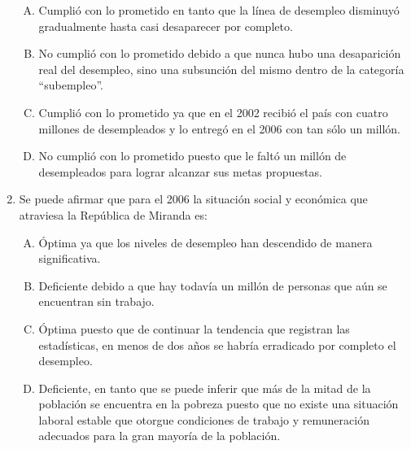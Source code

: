 \begin{enumerate}
\begin{enumerate}[(A) ]
\item   Cumplió con lo prometido en tanto que la línea de desempleo disminuyó gradualmente hasta casi desaparecer por completo.
 \item  No cumplió con lo prometido debido a que nunca hubo una desaparición real del desempleo, sino una subsunción del mismo dentro de la categoría ``subempleo''.
\item Cumplió con lo prometido ya que en el 2002 recibió el país con cuatro millones de desempleados y lo entregó en el 2006 con tan sólo un millón.
\item No cumplió con lo prometido puesto que le faltó un millón de desempleados para lograr alcanzar sus metas propuestas.
\end{enumerate}

\item Se puede afirmar que para el 2006 la situación social y económica que atraviesa la República de Miranda es:\label{sociii-25}


\begin{enumerate}[(A)]
\item   Óptima ya que los niveles de desempleo han descendido de manera significativa.
 \item  Deficiente debido a que hay todavía un millón de personas que aún se encuentran sin trabajo.
\item Óptima puesto que de continuar la tendencia que registran las estadísticas, en menos de dos años se habría erradicado por completo el desempleo.
\item Deficiente, en tanto que se puede inferir que más de la mitad de la población se encuentra en la pobreza puesto que no existe una situación laboral estable que otorgue condiciones de trabajo y remuneración adecuados para la gran mayoría de la población. 
\end{enumerate}


\end{enumerate}
